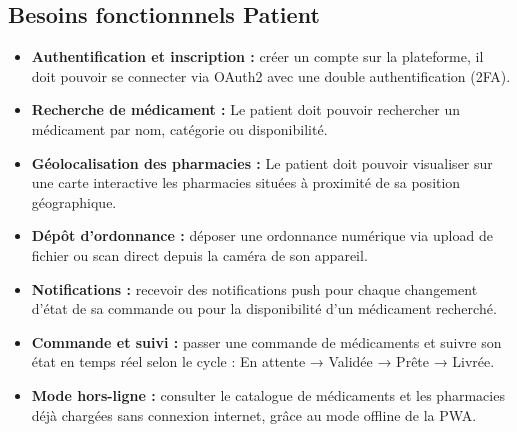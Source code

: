 \documentclass[12pt,a4paper]{report}
\begin{document}
	\subsection{Besoins fonctionnnels Patient} 
	\begin{itemize} 
		\item \textbf{Authentification et inscription : }créer un compte sur la plateforme, il doit pouvoir se connecter via OAuth2 avec une double authentification (2FA). 
		\item \textbf{Recherche de médicament : }Le patient doit pouvoir rechercher un médicament par nom, catégorie ou disponibilité. 
		\item \textbf{Géolocalisation des pharmacies : }Le patient doit pouvoir visualiser sur une carte interactive les pharmacies situées à proximité de sa position géographique. 
		\item \textbf{Dépôt d'ordonnance : }déposer une ordonnance numérique via upload de fichier ou scan direct depuis la caméra de son appareil. 
		\item \textbf{Notifications : }recevoir des notifications push pour chaque changement d'état de sa commande ou pour la disponibilité d'un médicament recherché. 
		\item \textbf{Commande et suivi : }passer une commande de médicaments et suivre son état en temps réel selon le cycle : En attente → Validée → Prête → Livrée. 
		\item \textbf{Mode hors-ligne : }consulter le catalogue de médicaments et les pharmacies déjà chargées sans connexion internet, grâce au mode offline de la PWA. 
	\end{itemize} 
	
\end{document}
